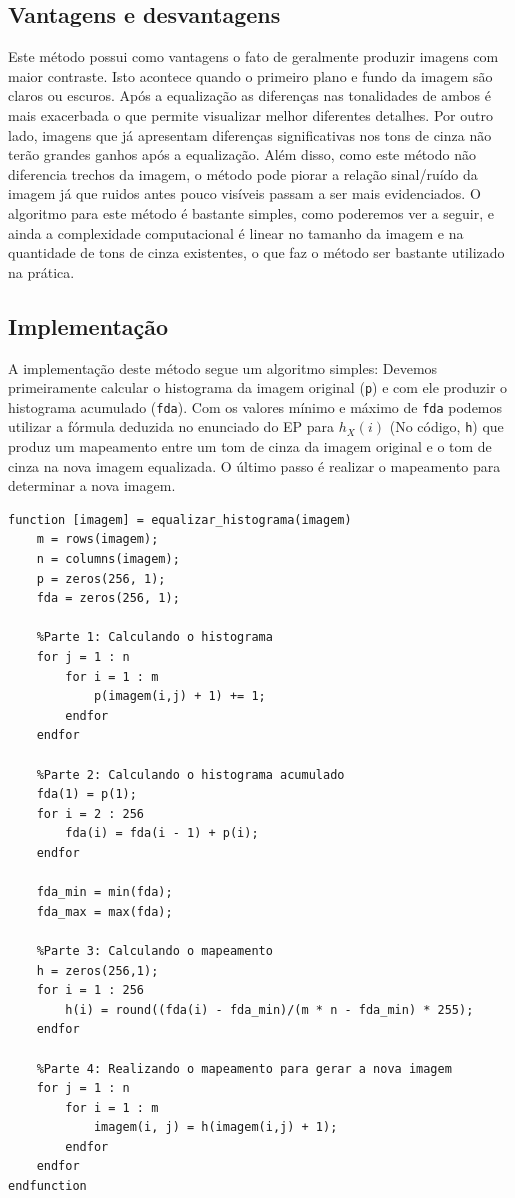 \documentclass[brazil,times]{abnt}
\begin{document}
		\subsection{Vantagens e desvantagens}
			Este método possui como vantagens o fato de geralmente produzir imagens com maior contraste. Isto acontece quando o primeiro plano e fundo da imagem são claros ou escuros. Após a equalização as diferenças nas tonalidades de ambos é mais exacerbada o que permite visualizar melhor diferentes detalhes. Por outro lado, imagens que já apresentam diferenças significativas nos tons de cinza não terão grandes ganhos após a equalização. Além disso, como este método não diferencia trechos da imagem, o método pode piorar a relação sinal/ruído da imagem já que ruidos antes pouco visíveis passam a ser mais evidenciados.
			O algoritmo para este método é bastante simples, como poderemos ver a seguir, e ainda a complexidade computacional é linear no tamanho da imagem e na quantidade de tons de cinza existentes, o que faz o método ser bastante utilizado na prática.
			
		\subsection{Implementação}
			A implementação deste método segue um algoritmo simples: Devemos primeiramente calcular o histograma da imagem original (\texttt{p}) e com ele produzir o histograma acumulado (\texttt{fda}). Com os valores mínimo e máximo de \texttt{fda} podemos utilizar a fórmula deduzida no enunciado do EP para $h_X (i)$ (No código, \texttt{h}) que produz um mapeamento entre um tom de cinza da imagem original e o tom de cinza na nova imagem equalizada. O último passo é realizar o mapeamento para determinar a nova imagem.


\begin{lstlisting}
function [imagem] = equalizar_histograma(imagem)
	m = rows(imagem);
	n = columns(imagem);
	p = zeros(256, 1);
	fda = zeros(256, 1);
	
	%Parte 1: Calculando o histograma
	for j = 1 : n
		for i = 1 : m
			p(imagem(i,j) + 1) += 1;
		endfor
	endfor
	
	%Parte 2: Calculando o histograma acumulado
	fda(1) = p(1);
	for i = 2 : 256
		fda(i) = fda(i - 1) + p(i);
	endfor
	
	fda_min = min(fda);
	fda_max = max(fda);
	
	%Parte 3: Calculando o mapeamento
	h = zeros(256,1);
	for i = 1 : 256
		h(i) = round((fda(i) - fda_min)/(m * n - fda_min) * 255);
	endfor
	
	%Parte 4: Realizando o mapeamento para gerar a nova imagem
	for j = 1 : n
		for i = 1 : m
			imagem(i, j) = h(imagem(i,j) + 1);
		endfor
	endfor
endfunction
\end{lstlisting}
\end{document}
